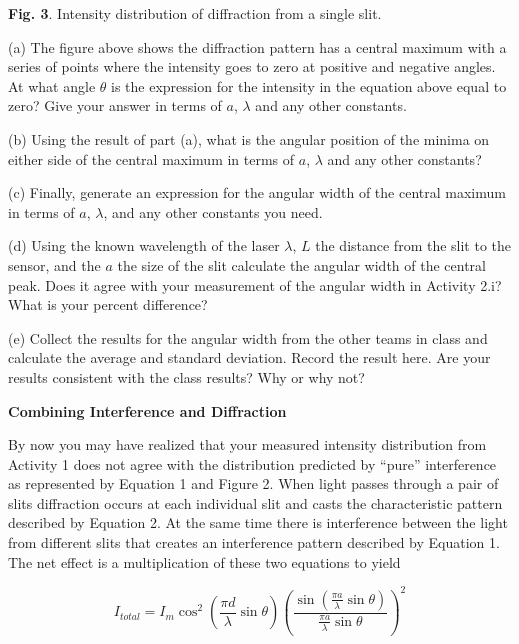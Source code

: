 {\centering \textbf{Fig. 3}. Intensity distribution of diffraction
from a single slit.\par}

\newpage

(a) The figure above shows the diffraction pattern has a central maximum
with a series of points where the intensity goes to zero at positive
and negative angles. At what angle $\theta$  is the expression for 
the intensity in the equation above equal to zero? Give your answer
in terms of $a$, $\lambda$ and any other constants.
\vspace{20mm}

(b) Using the result of part (a), what is the angular position of
the minima on either side of the central maximum
in terms of $a$, $\lambda$ and any other constants?
\vspace{20mm}

(c) Finally, generate an expression for the angular width of the central
maximum in terms of $a$, \( \lambda  \), and any other constants you
need.
\vspace{30mm}

(d) Using the known wavelength of the laser $\lambda$, $L$ the distance from
the slit to the sensor, and the $a$ the size of the slit calculate the angular 
width of the central peak.
Does it agree with your measurement of the angular width in Activity 2.i?
What is your percent difference?
\vspace{30mm}

(e) Collect the results for the angular width from the other teams in class
and calculate the average and standard deviation. Record the result here.
Are your results consistent with the class results? Why or why not?
\vspace{40mm}

\textbf{Combining Interference and Diffraction}

By now you may have realized that your measured intensity distribution
from Activity 1
does not  agree with the distribution predicted by {}``pure''
interference as represented by Equation 1 and Figure 2. When
light passes through a pair of slits diffraction occurs at each individual
slit and casts the characteristic pattern described by  
Equation 2. At the same time there is interference between the light
from different slits that creates an interference pattern described
by Equation 1. The net effect is a multiplication of these
two equations to yield 

\begin{equation} I_{total} = I_m \cos^2 (\frac {\pi d} {\lambda} \sin \theta ) (\frac {\sin (\frac {\pi a} {\lambda} \sin \theta)} {\frac {\pi a} {\lambda} \sin \theta} )^2 \end{equation}

